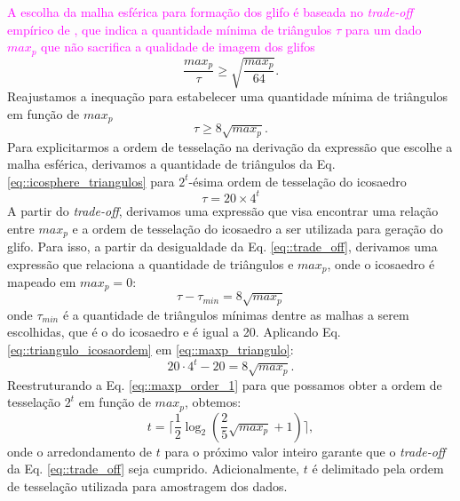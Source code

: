 \textcolor{magenta}{
A escolha da malha esférica para formação dos glifo é baseada no \textit{trade-off} empírico de , que indica a quantidade mínima de triângulos $\tau$ para um dado $max_p$ que não sacrifica a qualidade de imagem dos glifos
}
\begin{equation}
\label{eq::trade_off}
    \frac{max_p}{\tau} \geq \sqrt{\frac{max_p}{64}}.
\end{equation}
Reajustamos a inequação para estabelecer uma quantidade mínima de triângulos em função de $max_p$
\begin{equation}
\label{eq::trade_off_2}
    \tau \geq 8\sqrt{max_p}
    .
\end{equation}
 Para explicitarmos a ordem de tesselação na derivação da expressão que escolhe a malha esférica, derivamos a quantidade de triângulos da Eq. \ref{eq::icosphere_triangulos} para $2^t$-ésima ordem de tesselação do icosaedro
\begin{equation}
\label{eq::triangulo_icosaordem}
    \tau = 20\times 4^t
\end{equation}
A partir do \textit{trade-off}, derivamos uma expressão que visa encontrar uma relação entre $max_p$ e a ordem de tesselação do icosaedro a ser utilizada para geração do glifo. Para isso, a partir da desigualdade da Eq. \ref{eq::trade_off}, derivamos uma expressão que relaciona a quantidade de triângulos e $max_p$, onde o icosaedro é mapeado em $max_p = 0$:
\begin{equation}
\label{eq::maxp_triangulo}
    \tau - \tau_{min} = 8\sqrt{max_p}
\end{equation}
onde $\tau_{min}$ é a quantidade de triângulos mínimas dentre as malhas a serem escolhidas, que é o do icosaedro e é igual a 20. Aplicando Eq. \ref{eq::triangulo_icosaordem} em  \ref{eq::maxp_triangulo}:
\begin{equation}
\label{eq::maxp_order_1}
    20 \cdot 4^t - 20 = 8\sqrt{max_p}
    .
\end{equation}
Reestruturando a Eq. \ref{eq::maxp_order_1} para que possamos obter a ordem de tesselação $2^t$ em função de $max_p$, obtemos:
\begin{equation}
\label{eq::icosa_order}
     t = \lceil \frac{1}{2}\log_2{(\frac{2}{5}\sqrt{max_p} + 1)} \rceil,
\end{equation}
onde o arredondamento de $t$ para o próximo valor inteiro garante que o \textit{trade-off} da Eq. \ref{eq::trade_off} seja cumprido. Adicionalmente, $t$ é delimitado pela ordem de tesselação utilizada para amostragem dos dados.

